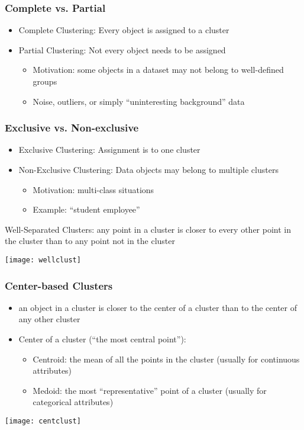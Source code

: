\begin{frame}[fragile]\frametitle{Complete vs. Partial}

\begin{itemize}
\item Complete Clustering: Every object is assigned to a cluster
\item Partial Clustering: Not every object needs to be assigned
\begin{itemize}
\item Motivation: some objects in a dataset may not belong to well-defined groups
\item Noise, outliers, or simply ``uninteresting background'' data
\end{itemize}
\end{itemize}
\end{frame}


\begin{frame}[fragile]\frametitle{Exclusive vs. Non-exclusive}

\begin{itemize}
\item Exclusive Clustering: Assignment is to one cluster
\item Non-Exclusive Clustering: Data objects may belong to multiple clusters
\begin{itemize}
\item Motivation: multi-class situations
\item Example: ``student employee''
\end{itemize}
\end{itemize}
Well-Separated Clusters: any point in a cluster is closer to every other point in the cluster than to any point not in the cluster
\begin{center}
\texttt{[image: wellclust]}
\end{center}

\end{frame}

\begin{frame}[fragile]\frametitle{Center-based Clusters}
\begin{itemize}
\item an object in a cluster is closer to the center of a cluster than to the center of any other cluster
\item Center of a cluster (``the most central point''): 
\begin{itemize}
\item Centroid: the mean of all the points in the cluster (usually for continuous attributes)
\item Medoid: the most ``representative'' point of a cluster (usually for categorical attributes)
\end{itemize}
\end{itemize}
\begin{center}
\texttt{[image: centclust]}
\end{center}
\end{frame}



